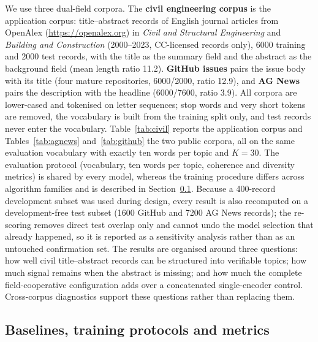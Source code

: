 \documentclass[11pt]{article}
\begin{document}
We use three dual-field corpora. The \textbf{civil engineering corpus} is the application corpus:
title--abstract records of English journal articles from OpenAlex \cite{openalex2022} (\url{https://openalex.org}) in \emph{Civil and Structural
Engineering} and \emph{Building and Construction} (2000--2023, CC-licensed records only), 6000
training and 2000 test records, with the title as the summary field and the abstract as the
background field (mean length ratio 11.2). \textbf{GitHub issues} \cite{openindex2026} pairs the
issue body with its title (four mature repositories, 6000/2000, ratio 12.9), and \textbf{AG News}
\cite{zhang2015char} pairs the description
with the headline (6000/7600, ratio 3.9). All corpora are lower-cased and tokenised on letter
sequences; stop words and very short tokens are removed, the vocabulary is built from the training
split only, and test records never enter the vocabulary. Table~\ref{tab:civil} reports the
application corpus and Tables~\ref{tab:agnews} and~\ref{tab:github} the two public corpora, all on
the same evaluation vocabulary with exactly ten words per topic and $K=30$. The evaluation
protocol (vocabulary, ten words per topic, coherence and
diversity metrics) is shared by every model, whereas the training procedure differs across
algorithm families and is described in Section~\ref{sec:protocol}. Because a 400-record
development subset was used during design, every result is also
recomputed on a development-free test subset (1600 GitHub and 7200 AG News records); the
re-scoring removes direct test overlap only and cannot undo the model selection that already
happened, so it is reported as a sensitivity analysis rather than as an untouched confirmation
set. The results are organised around three questions: how well civil title--abstract records can
be structured into verifiable topics; how much signal remains when the abstract is missing; and
how much the complete field-cooperative configuration adds over a concatenated single-encoder
control. Cross-corpus diagnostics support these questions rather than replacing them.

\subsection{Baselines, training protocols and metrics}
\label{sec:protocol}
\end{document}
